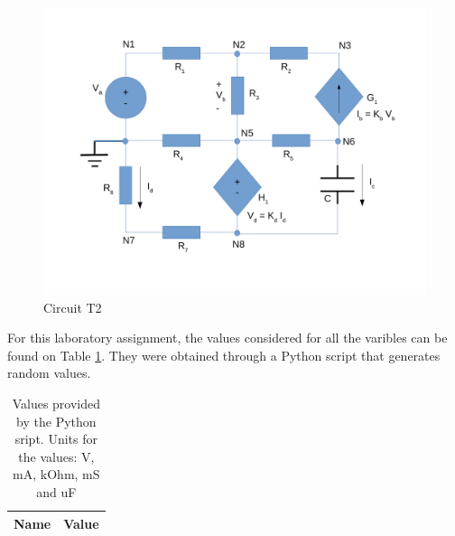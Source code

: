 \begin{figure}[ht]
	\centering
	\includegraphics[width=0.85\linewidth]{dsnh_t2.pdf}
	\caption{Circuit T2}
\label{fig:Desenho_t2}
\end{figure}


\vspace{1cm}

For this laboratory assignment, the values considered for all the varibles can be
found on Table \ref{tab:given_vls}. They were obtained through a Python script that
generates random values. 

\begin{table}[ht]
	\centering
	\begin{tabular}{|l|r|}
		\hline    
		{\bf Name} & {\bf Value} \\ \hline
    		
	\end{tabular}
	
	\caption{Values provided by the Python sript. Units for the values: V, mA, kOhm, mS and uF}
    
\label{tab:given_vls}
\end{table}

